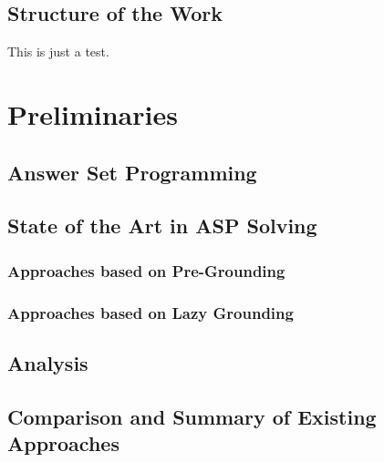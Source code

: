 \documentclass{vutinfth} %
\theoremstyle{example}
\theoremstyle{definition}
\theoremstyle{theorem}
\theoremstyle{lemma}
\theoremstyle{corollary}
\begin{document}
\section{Structure of the Work} %

This is just a test.\cite{Gebser:2012:CAS:2228640.2228952}

\chapter{Preliminaries}
\label{chap:preliminaries}

\section{Answer Set Programming}


\section{State of the Art in ASP Solving}


\subsection{Approaches based on Pre-Grounding}



\subsection{Approaches based on Lazy Grounding}

\section{Analysis}

\section{Comparison and Summary of Existing Approaches}
\end{document}
